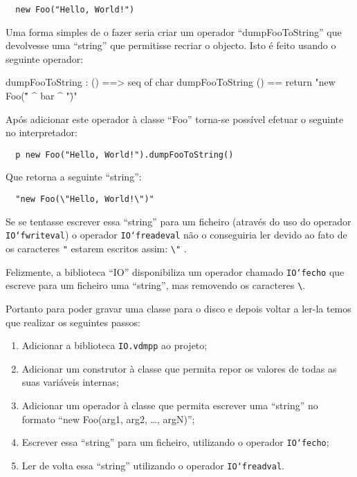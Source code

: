 \begin{verbatim}
  new Foo("Hello, World!")
\end{verbatim}

Uma forma simples de o fazer seria criar um operador
``dumpFooToString'' que devolvesse uma ``string'' que permitisse
recriar o objecto. Isto é feito usando o seguinte operador:

\begin{vdm_al}
  dumpFooToString : () ==> seq of char
  dumpFooToString () ==
    return "new Foo(\"" ^ bar ^ "\")"
\end{vdm_al}

Após adicionar este operador à classe ``Foo'' torna-se possível
efetuar o seguinte no interpretador:

\begin{verbatim}
  p new Foo("Hello, World!").dumpFooToString()
\end{verbatim}

Que retorna a seguinte ``string'':

\begin{verbatim}
  "new Foo(\"Hello, World!\")"
\end{verbatim}

Se se tentasse escrever essa ``string'' para um ficheiro (através do
uso
do operador \texttt{IO`fwriteval}) o operador
\texttt{IO`freadeval} não o conseguiria ler devido ao fato de os
caracteres \texttt{"} estarem escritos assim: \verb=\"= .

Felizmente, a biblioteca ``IO'' disponibiliza um operador chamado
\texttt{IO`fecho} que escreve para um ficheiro uma ``string'', mas
removendo os caracteres \verb=\=.

Portanto para poder gravar uma classe para o disco e depois voltar a
ler-la temos que realizar os seguintes passos:

\begin{enumerate}
\item Adicionar a biblioteca \texttt{IO.vdmpp} ao projeto;
\item Adicionar um construtor à classe que permita repor os valores de
  todas as suas variáveis internas;
\item Adicionar um operador à classe que permita escrever uma ``string''
  no formato ``new Foo(arg1, arg2, \ldots, argN)'';
\item Escrever essa ``string'' para um ficheiro, utilizando o operador
  \texttt{IO`fecho};
\item Ler de volta essa ``string'' utilizando o operador
  \texttt{IO`freadval}.
\end{enumerate}

